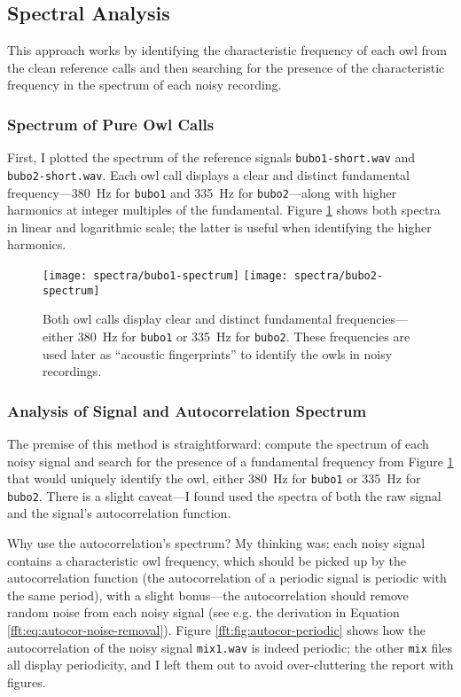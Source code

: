 \documentclass[11pt, a4paper]{article}
\begin{document}
\subsection{Spectral Analysis}
This approach works by identifying the characteristic frequency of each owl from the clean reference calls and then searching for the presence of the characteristic frequency in the spectrum of each noisy recording. 

\subsubsection{Spectrum of Pure Owl Calls}
First, I plotted the spectrum of the reference signals \texttt{bubo1-short.wav} and \texttt{bubo2-short.wav}. Each owl call displays a clear and distinct fundamental frequency---\SI{380}{\hertz} for \texttt{bubo1} and \SI{335}{\hertz} for \texttt{bubo2}---along with higher harmonics at integer multiples of the fundamental. Figure \ref{fft:fig:probe-spectra} shows both spectra in linear and logarithmic scale; the latter is useful when identifying the higher harmonics.


\begin{figure}[htb!]
	\centering
	\texttt{[image: spectra/bubo1-spectrum]}\vfill  
	\texttt{[image: spectra/bubo2-spectrum]}\vfill  
	\caption{Both owl calls display clear and distinct fundamental frequencies---either \SI{380}{\hertz} for \texttt{bubo1} or \SI{335}{\hertz} for \texttt{bubo2}. These frequencies are used later as ``acoustic fingerprints'' to identify the owls in noisy recordings.}
	\label{fft:fig:probe-spectra}
\end{figure}
 

\subsubsection{Analysis of Signal and Autocorrelation Spectrum}
The premise of this method is straightforward: compute the spectrum of each noisy signal and search for the presence of a fundamental frequency from Figure \ref{fft:fig:probe-spectra} that would uniquely identify the owl, either \SI{380}{\hertz} for \texttt{bubo1} or \SI{335}{\hertz} for \texttt{bubo2}. There is a slight caveat---I found used the spectra of both the raw signal and the signal's autocorrelation function. 

Why use the autocorrelation's spectrum? My thinking was: each noisy signal contains a characteristic owl frequency, which should be picked up by the autocorrelation function (the autocorrelation of a periodic signal is periodic with the same period), with a slight bonus---the autocorrelation should remove random noise from each noisy signal (see e.g. the derivation in Equation \ref{fft:eq:autocor-noise-removal}). Figure \ref{fft:fig:autocor-periodic} shows how the autocorrelation of the noisy signal \texttt{mix1.wav} is indeed periodic; the other \texttt{mix} files all display periodicity, and I left them out to avoid over-cluttering the report with figures.
\end{document}
